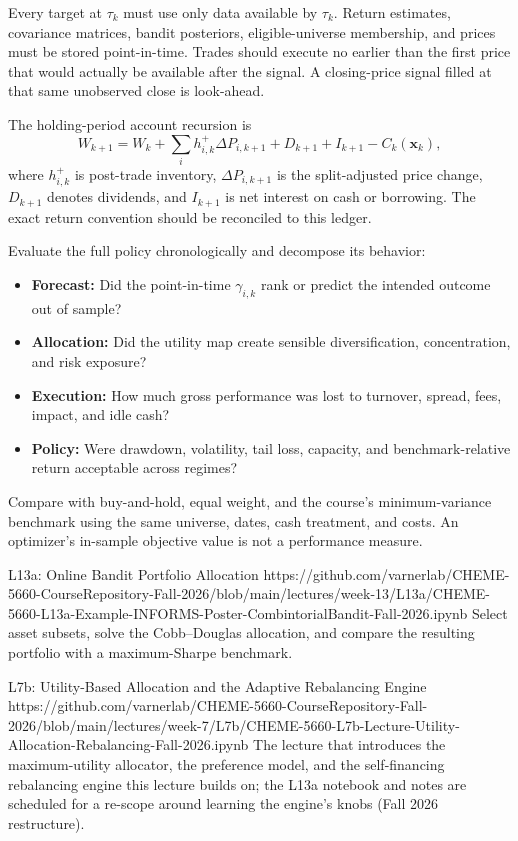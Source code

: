 \documentclass[11pt]{article}
\begin{document}
Every target at $\tau_k$ must use only data available by $\tau_k$. Return estimates, covariance matrices, bandit posteriors, eligible-universe membership, and prices must be stored point-in-time. Trades should execute no earlier than the first price that would actually be available after the signal. A closing-price signal filled at that same unobserved close is look-ahead.

The holding-period account recursion is
\begin{equation}
  \label{eq:wealth-recursion}
  W_{k+1}=W_k+\sum_i h_{i,k}^+\Delta P_{i,k+1}
  +D_{k+1}+I_{k+1}-C_k(\mathbf x_k),
\end{equation}
where $h_{i,k}^+$ is post-trade inventory, $\Delta P_{i,k+1}$ is the split-adjusted price change, $D_{k+1}$ denotes dividends, and $I_{k+1}$ is net interest on cash or borrowing. The exact return convention should be reconciled to this ledger.

Evaluate the full policy chronologically and decompose its behavior:
\begin{itemize}[leftmargin=1.3em,itemsep=2pt,topsep=2pt]
  \item \textbf{Forecast:} Did the point-in-time $\gamma_{i,k}$ rank or predict the intended outcome out of sample?
  \item \textbf{Allocation:} Did the utility map create sensible diversification, concentration, and risk exposure?
  \item \textbf{Execution:} How much gross performance was lost to turnover, spread, fees, impact, and idle cash?
  \item \textbf{Policy:} Were drawdown, volatility, tail loss, capacity, and benchmark-relative return acceptable across regimes?
\end{itemize}
Compare with buy-and-hold, equal weight, and the course's minimum-variance benchmark using the same universe, dates, cash treatment, and costs. An optimizer's in-sample objective value is not a performance measure.

\notebooklink
  {L13a: Online Bandit Portfolio Allocation}
  {https://github.com/varnerlab/CHEME-5660-CourseRepository-Fall-2026/blob/main/lectures/week-13/L13a/CHEME-5660-L13a-Example-INFORMS-Poster-CombintorialBandit-Fall-2026.ipynb}
  {Select asset subsets, solve the Cobb--Douglas allocation, and compare the resulting portfolio with a maximum-Sharpe benchmark.}

\notebooklink
  {L7b: Utility-Based Allocation and the Adaptive Rebalancing Engine}
  {https://github.com/varnerlab/CHEME-5660-CourseRepository-Fall-2026/blob/main/lectures/week-7/L7b/CHEME-5660-L7b-Lecture-Utility-Allocation-Rebalancing-Fall-2026.ipynb}
  {The lecture that introduces the maximum-utility allocator, the preference model, and the self-financing rebalancing engine this lecture builds on; the L13a notebook and notes are scheduled for a re-scope around learning the engine's knobs (Fall 2026 restructure).}
\end{document}
